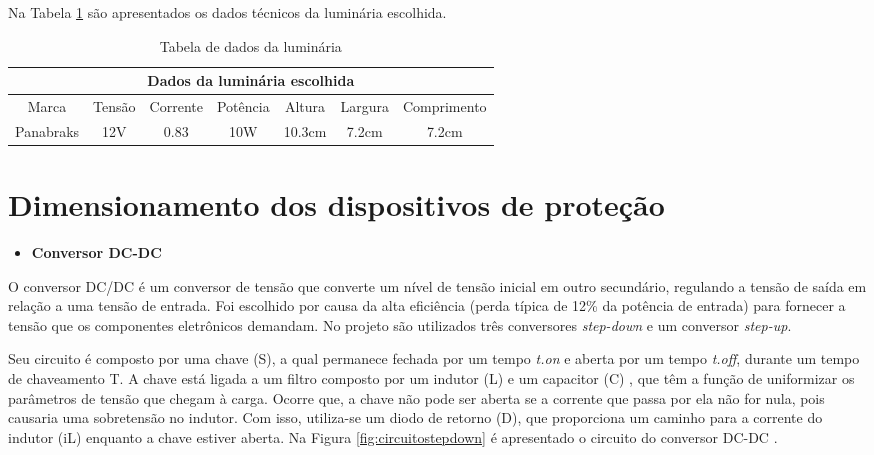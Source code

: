 Na Tabela \ref{tab:luminaria} são apresentados os dados técnicos da luminária escolhida.

    \begin{table}[H]
    

\begin{tabular}{|c|c|c|c|c|c|c|}
\hline
\multicolumn{7}{|c|}{Dados da luminária escolhida}                                                 \\ \hline
Marca             & Tensão         & Corrente & Potência & Altura & Largura & Comprimento \\ \hline
Panabraks  & 12V  & 0.83          & 10W   & 10.3cm & 7.2cm & 7.2cm \\ \hline

\end{tabular}
    \caption{\label{tab:luminaria}Tabela de dados da luminária}
\end{table}


\section{Dimensionamento dos dispositivos de proteção}

\begin{itemize}
    \item \textbf{Conversor DC-DC}
\end{itemize}
O conversor DC/DC  é um conversor de tensão que converte um nível de tensão inicial em outro secundário, regulando a tensão de saída em relação a uma tensão de entrada. Foi escolhido por causa da alta eficiência (perda típica de 12\% da potência de entrada) para fornecer a tensão que os componentes eletrônicos demandam. No projeto são utilizados três conversores \textit{step-down} e um conversor \textit{step-up}.
    
Seu circuito é composto por uma chave (S), a qual permanece fechada por um tempo \textit{t.on} e aberta por um tempo \textit{t.off}, durante um tempo de chaveamento T. A chave está ligada a um filtro composto por um indutor (L) e um capacitor (C) , que têm a função de uniformizar os parâmetros de tensão que chegam à carga. Ocorre que, a chave não pode ser aberta se a corrente que passa por ela não for nula, pois causaria uma sobretensão no indutor. Com isso, utiliza-se um diodo de retorno (D), que proporciona um caminho para a corrente do indutor (iL) enquanto a chave estiver aberta. Na Figura \ref{fig:circuitostepdown} é apresentado o circuito do conversor DC-DC \cite{Amauri}.

